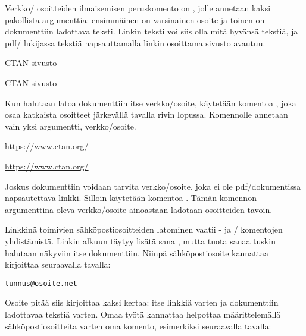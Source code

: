 Verkko\-/ osoitteiden ilmaisemisen peruskomento on ,
jolle annetaan kaksi pakollista argumenttia: ensimmäinen on varsinainen
osoite ja toinen on dokumenttiin ladottava teksti. Linkin teksti voi
siis olla mitä hyvänsä tekstiä, ja pdf\-/ lukijassa tekstiä
napsauttamalla linkin osoittama sivusto avautuu.

\begin{koodilohkosis}
  \href{https://www.ctan.org/}{CTAN-sivusto}
\end{koodilohkosis}

\begin{tulossis}
  \href{https://www.ctan.org/}{CTAN-sivusto}
\end{tulossis}

Kun halutaan latoa dokumenttiin itse verkko\-/osoite, käytetään komentoa
,  joka osaa katkaista osoitteet
järkevällä tavalla rivin lopussa. Komennolle annetaan vain yksi
argumentti, verkko\-/osoite.

\begin{koodilohkosis}
  \url{https://www.ctan.org/}
\end{koodilohkosis}

\begin{tulossis}
  \url{https://www.ctan.org/}
\end{tulossis}

Joskus dokumenttiin voidaan tarvita verkko\-/osoite, joka ei ole
pdf\-/dokumentissa napsautettava linkki. Silloin käytetään komentoa
. Tämän komennon argumenttina oleva verkko\-/osoite
ainoastaan ladotaan osoitteiden tavoin.

Linkkinä toimivien sähköpostiosoitteiden latominen vaatii
- ja \-/ komentojen yhdistämistä.
Linkin alkuun täytyy lisätä sana , mutta tuota sanaa
tuskin halutaan näkyviin itse dokumenttiin. Niinpä sähköpostiosoite
kannattaa kirjoittaa seuraavalla tavalla:

\begin{koodilohkosis}
  \href{mailto:tunnus@osoite.net}{\nolinkurl{tunnus@osoite.net}}
\end{koodilohkosis}

Osoite pitää siis kirjoittaa kaksi kertaa: itse linkkiä varten ja
dokumenttiin ladottavaa tekstiä varten. Omaa työtä kannattaa helpottaa
määrittelemällä sähköpostiosoitteita varten oma komento, esimerkiksi
seuraavalla tavalla:

